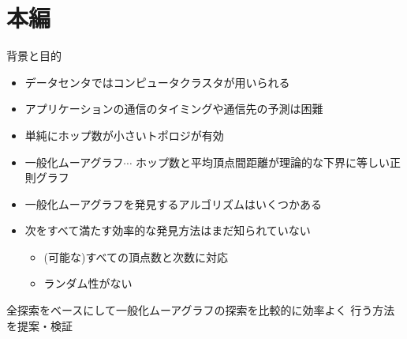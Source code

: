 
\begin{frame}
  \maketitle
\end{frame}

\section{本編}
\begin{frame}{背景と目的}
  \begin{itemize}
  \item データセンタではコンピュータクラスタが用いられる
  \item アプリケーションの通信のタイミングや通信先の予測は困難
  \item 単純にホップ数が小さいトポロジが有効\cite{Koibuchi2012, Singla2011}
  \item \alert{一般化ムーアグラフ}$\cdots$
    ホップ数と平均頂点間距離が理論的な下界に等しい正則グラフ
    \cite{cerf1973computer, Cerf1974}
  \item 一般化ムーアグラフを発見するアルゴリズムはいくつかある
    \cite{Sampels2004, Fujita2015, Yamamoto2016}
  \item 次をすべて満たす効率的な発見方法はまだ知られていない
    \begin{itemize}
    \item (可能な)すべての頂点数と次数に対応
    \item ランダム性がない
    \end{itemize}
  \end{itemize}
  \begin{block}{}
    全探索をベースにして一般化ムーアグラフの探索を比較的に効率よく
    行う方法を提案・検証
  \end{block}
\end{frame}

